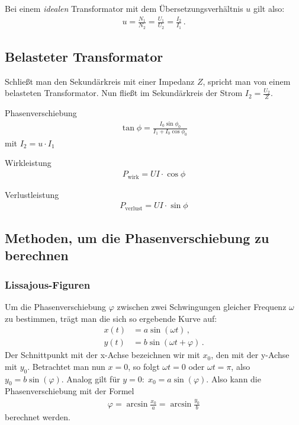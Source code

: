 \documentclass[12pt,a4paper,titlepage,headinclude,bibtotoc]{scrartcl}
\begin{document}
Bei einem \textit{idealen} Transformator mit dem Übersetzungsverhältnis $u$ gilt also:
\begin{align}
	u=\frac{N_1}{N_2}=\frac{U_1}{U_2}=\frac{I_2}{I_1}\,.
	\label{eq:u}  
\end{align}

\subsection{Belasteter Transformator}
Schließt man den Sekundärkreis mit einer Impedanz $Z$, spricht man von einem belasteten Transformator. Nun fließt im Sekundärkreis der Strom $I_2=\frac{U_2}{Z}$.

Phasenverschiebung
\begin{align}
	\tan\phi=\frac{I_0 \sin\phi_0}{I_1+I_0\cos\phi_0}
	\label{eq:phase_theo}
\end{align}
mit $I_2=u\cdot I_1$

Wirkleistung
\begin{align}
	P_\text{wirk}=UI\cdot\cos\phi
\end{align}

Verlustleistung
\begin{align}
	P_\text{verlust}=UI\cdot\sin\phi
\end{align}

\subsection{Methoden, um die Phasenverschiebung zu berechnen}
\subsubsection{Lissajous-Figuren}
Um die Phasenverschiebung $\varphi$ zwischen zwei Schwingungen gleicher Frequenz $\omega$ zu bestimmen, trägt man die sich so ergebende Kurve auf:
\begin{align*}
	x(t)&=a\sin(\omega t)\,,\\
	y(t)&=b\sin(\omega t + \varphi) \,.
\end{align*}
Der Schnittpunkt mit der x-Achse bezeichnen wir mit $x_0$, den mit der y-Achse mit $y_0$.
Betrachtet man nun $x=0$, so folgt $\omega t=0$ oder $\omega t=\pi$, also $y_0=b \sin(\varphi)$.
Analog gilt für $y=0:\;x_0=a\sin(\varphi)$.
Also kann die Phasenverschiebung mit der Formel
\begin{align}
	\varphi=\arcsin\frac{x_0}{a}=\arcsin\frac{y_0}{b}
	\label{eq:lissajous}
\end{align}
berechnet werden.
\end{document}
